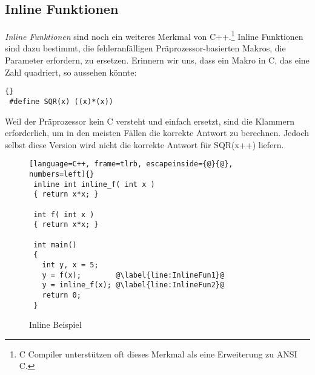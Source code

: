 \subsection{Inline Funktionen}

\emph{Inline Funktionen} sind noch ein weiteres Merkmal von
C++.\footnote{C Compiler unterst\"{u}tzen oft dieses Merkmal als eine
Erweiterung zu ANSI C.} Inline Funktionen sind dazu bestimmt, die
fehleranf\"{a}lligen Pr\"{a}prozessor-basierten Makros, die Parameter
erfordern, zu ersetzen. Erinnern wir uns, dass ein Makro in C, das
eine Zahl quadriert, so aussehen k\"{o}nnte:
\begin{lstlisting}[stepnumber=0]{}
 #define SQR(x) ((x)*(x))
\end{lstlisting}
\noindent Weil der Pr\"{a}prozessor kein C versteht und einfach ersetzt,
sind die Klammern erforderlich, um in den meisten F\"{a}llen die
korrekte Antwort zu berechnen. Jedoch selbst diese Version wird
nicht die korrekte Antwort f\"{u}r {\code SQR(x++)} liefern.

\begin{figure}
\begin{lstlisting}[language=C++, frame=tlrb, escapeinside={@}{@}, numbers=left]{}
 inline int inline_f( int x )
 { return x*x; }

 int f( int x )
 { return x*x; }

 int main()
 {
   int y, x = 5;
   y = f(x);        @\label{line:InlineFun1}@
   y = inline_f(x); @\label{line:InlineFun2}@
   return 0;
 }
\end{lstlisting}
\caption{Inline Beispiel \label{fig:InlineFun}}
\end{figure}

